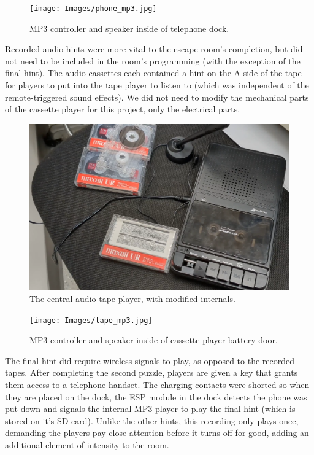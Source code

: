 \documentclass[conference]{IEEEtran}
\begin{document}
\begin{figure}[ht]
    \centering
    \texttt{[image: Images/phone\_mp3.jpg]}
    \caption{MP3 controller and speaker inside of telephone dock.}
\end{figure}

\indent Recorded audio hints were more vital to the escape room's completion, but did not need to be included in the room's 
programming (with the exception of the final hint). The audio cassettes each contained a hint on the A-side of the 
tape for players to put into the tape player to listen to (which was independent of the remote-triggered sound effects). 
We did not need to modify the mechanical parts of the cassette player for this project, only the electrical parts.

\begin{figure}[ht]
    \centering
    \includegraphics[width=0.90\columnwidth]{Images/tape_player.png}
    \caption{The central audio tape player, with modified internals.}
\end{figure}

\begin{figure}[ht]
    \centering
    \texttt{[image: Images/tape\_mp3.jpg]}
    \caption{MP3 controller and speaker inside of cassette player battery door.}
\end{figure}

\indent The final hint did require wireless signals to play, as opposed to the recorded tapes. After completing the 
second puzzle, players are given a key that grants them access to a telephone handset. The charging contacts were shorted 
so when they are placed on the dock, the ESP module in the dock detects the phone was put down and signals the internal MP3 
player to play the final hint (which is stored on it's SD card). Unlike the other hints, this recording only plays once, 
demanding the players pay close attention before it turns off for good, adding an additional element of intensity to the room.
\end{document}
